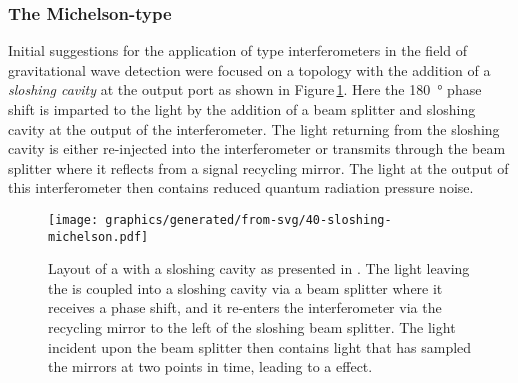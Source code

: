 \subsubsection{The Michelson-type \SM{}}
Initial suggestions for the application of \SM{} type interferometers in the field of gravitational wave detection were focused on a \FPMI{} topology with the addition of a \emph{sloshing cavity} at the output port \cite{Braginsky2000, Purdue2002} as shown in Figure\,\ref{fig:sloshing-michelson}. Here the \SI{180}{\degree} phase shift is imparted to the light by the addition of a beam splitter and sloshing cavity at the output of the interferometer. The light returning from the sloshing cavity is either re-injected into the interferometer or transmits through the beam splitter where it reflects from a signal recycling mirror. The light at the output of this interferometer then contains reduced quantum radiation pressure noise.

\begin{figure}
  \centering
  \texttt{[image: graphics/generated/from-svg/40-sloshing-michelson.pdf]}
  \caption[Layout of a \FPMI{} with a sloshing cavity]{\label{fig:sloshing-michelson}Layout of a \FPMI{} with a sloshing cavity as presented in \cite{Purdue2002}. The light leaving the \FPMI{} is coupled into a sloshing cavity via a beam splitter where it receives a phase shift, and it re-enters the interferometer via the recycling mirror to the left of the sloshing beam splitter. The light incident upon the beam splitter then contains light that has sampled the mirrors at two points in time, leading to a \SM{} effect.}
\end{figure}

